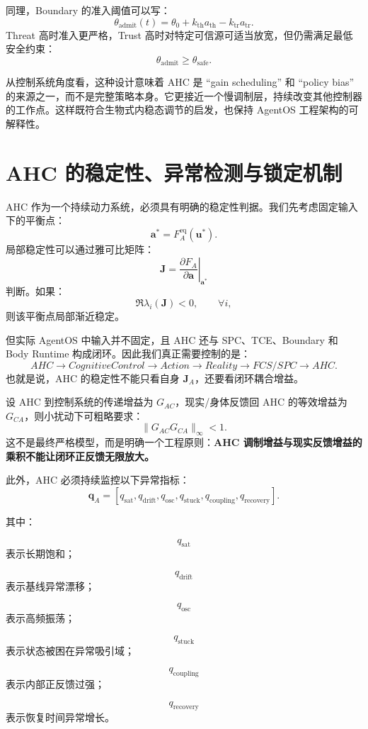 同理，Boundary 的准入阈值可以写：
\[
\theta_{\mathrm{admit}}(t)
=
\theta_0
+
k_{\mathrm{th}}
a_{\mathrm{th}}
-
k_{\mathrm{tr}}
a_{\mathrm{tr}}.
\]
Threat 高时准入更严格，Trust 高时对特定可信源可适当放宽，但仍需满足最低安全约束：
\[
\theta_{\mathrm{admit}}
\ge
\theta_{\mathrm{safe}}.
\]

从控制系统角度看，这种设计意味着 AHC 是 ``gain scheduling'' 和 ``policy bias'' 的来源之一，而不是完整策略本身。它更接近一个慢调制层，持续改变其他控制器的工作点。这样既符合生物式内稳态调节的启发，也保持 AgentOS 工程架构的可解释性。


\section{AHC 的稳定性、异常检测与锁定机制}

AHC 作为一个持续动力系统，必须具有明确的稳定性判据。我们先考虑固定输入下的平衡点：
\[
\mathbf a^*
=
F_A^{\mathrm{eq}}(
\mathbf u^*
).
\]
局部稳定性可以通过雅可比矩阵：
\[
\mathbf J
=
\left.
\frac{\partial F_A}
{\partial\mathbf a}
\right|_{\mathbf a^*}
\]
判断。如果：
\[
\Re\lambda_i(\mathbf J)<0,
\qquad
\forall i,
\]
则该平衡点局部渐近稳定。

但实际 AgentOS 中输入并不固定，且 AHC 还与 SPC、TCE、Boundary 和 Body Runtime 构成闭环。因此我们真正需要控制的是：
\[
AHC
\rightarrow
CognitiveControl
\rightarrow
Action
\rightarrow
Reality
\rightarrow
FCS/SPC
\rightarrow
AHC.
\]
也就是说，AHC 的稳定性不能只看自身 $\mathbf J_A$，还要看闭环耦合增益。

设 AHC 到控制系统的传递增益为 $G_{AC}$，现实/身体反馈回 AHC 的等效增益为 $G_{CA}$，则小扰动下可粗略要求：
\[
\|G_{AC}G_{CA}\|_\infty<1.
\]
这不是最终严格模型，而是明确一个工程原则：\textbf{AHC 调制增益与现实反馈增益的乘积不能让闭环正反馈无限放大。}

此外，AHC 必须持续监控以下异常指标：
\[
\mathbf q_A
=
[
q_{\mathrm{sat}},
q_{\mathrm{drift}},
q_{\mathrm{osc}},
q_{\mathrm{stuck}},
q_{\mathrm{coupling}},
q_{\mathrm{recovery}}
].
\]

其中：

\[
q_{\mathrm{sat}}
\]
表示长期饱和；

\[
q_{\mathrm{drift}}
\]
表示基线异常漂移；

\[
q_{\mathrm{osc}}
\]
表示高频振荡；

\[
q_{\mathrm{stuck}}
\]
表示状态被困在异常吸引域；

\[
q_{\mathrm{coupling}}
\]
表示内部正反馈过强；

\[
q_{\mathrm{recovery}}
\]
表示恢复时间异常增长。

